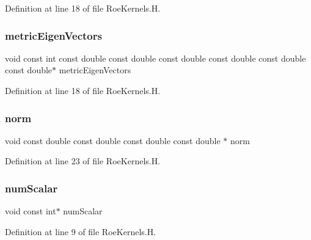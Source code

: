 Definition at line 18 of file Roe\+Kernels.\+H.

\hypertarget{RoeKernels_8H_abc719b26d5e9b9d4a4f40ad4261c5f70}{}\label{RoeKernels_8H_abc719b26d5e9b9d4a4f40ad4261c5f70} 
\subsubsection{\texorpdfstring{metric\+Eigen\+Vectors}{metricEigenVectors}}
{\footnotesize\ttfamily void const int const double const double const double const double const double const double$\ast$ metric\+Eigen\+Vectors}



Definition at line 18 of file Roe\+Kernels.\+H.

\hypertarget{RoeKernels_8H_a2f4a1dd2ebbf44fdb86ecebd7a4c2d0d}{}\label{RoeKernels_8H_a2f4a1dd2ebbf44fdb86ecebd7a4c2d0d} 
\subsubsection{\texorpdfstring{norm}{norm}}
{\footnotesize\ttfamily void const double const double const double const double $\ast$ norm}



Definition at line 23 of file Roe\+Kernels.\+H.

\hypertarget{RoeKernels_8H_a69440a5a13a588383e4cf4872dcba0ec}{}\label{RoeKernels_8H_a69440a5a13a588383e4cf4872dcba0ec} 
\subsubsection{\texorpdfstring{num\+Scalar}{numScalar}}
{\footnotesize\ttfamily void const int$\ast$ num\+Scalar}



Definition at line 9 of file Roe\+Kernels.\+H.

\hypertarget{RoeKernels_8H_adfdaef4223583c4c0fc2fd3930f44a71}{}\label{RoeKernels_8H_adfdaef4223583c4c0fc2fd3930f44a71} 
